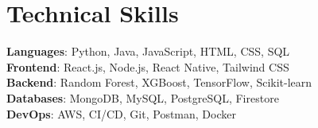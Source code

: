 \documentclass[letterpaper,11pt]{article}
\begin{document}
\section{Technical Skills}
 \begin{itemize}[leftmargin=0.15in, label={}]
    \small{\item{
     \textbf{Languages}{: Python, Java, JavaScript, HTML, CSS, SQL} \\
     \textbf{Frontend}{: React.js, Node.js, React Native, Tailwind CSS} \\
     \textbf{Backend}{: Random Forest, XGBoost, TensorFlow, Scikit-learn} \\
     \textbf{Databases}{: MongoDB, MySQL, PostgreSQL, Firestore} \\
     \textbf{DevOps}{: AWS, CI/CD, Git, Postman, Docker}
    }}
 \end{itemize}
 \vspace{-16pt}
\end{document}
